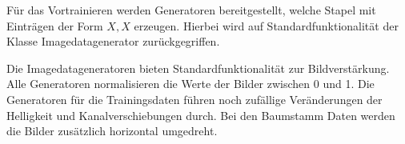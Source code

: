 	Für das Vortrainieren werden Generatoren bereitgestellt, welche Stapel mit Einträgen der Form $X ,X$ erzeugen. Hierbei wird auf Standardfunktionalität der Klasse Imagedatagenerator zurückgegriffen.
	
	Die Imagedatageneratoren bieten Standardfunktionalität zur Bildverstärkung. Alle Generatoren normalisieren die Werte der Bilder zwischen 0 und 1. Die Generatoren für die Trainingsdaten führen noch zufällige Veränderungen der Helligkeit und Kanalverschiebungen durch. Bei den Baumstamm Daten werden die Bilder zusätzlich horizontal umgedreht. 


 


 
